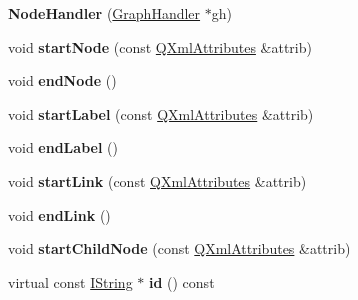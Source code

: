 \begin{DoxyCompactItemize}
\item 
\hypertarget{class_node_handler_ad8877961981fe68380ad0bcc79fce7ac}{{\bfseries Node\-Handler} (\hyperlink{class_graph_handler}{Graph\-Handler} $\ast$gh)}\label{class_node_handler_ad8877961981fe68380ad0bcc79fce7ac}

\item 
\hypertarget{class_node_handler_a83956918f974591de4c7abe4f194060c}{void {\bfseries start\-Node} (const \hyperlink{class_q_xml_attributes}{Q\-Xml\-Attributes} \&attrib)}\label{class_node_handler_a83956918f974591de4c7abe4f194060c}

\item 
\hypertarget{class_node_handler_a91894c1a2d6607200f926582c301791b}{void {\bfseries end\-Node} ()}\label{class_node_handler_a91894c1a2d6607200f926582c301791b}

\item 
\hypertarget{class_node_handler_a2b663a7dc2bd0f3497886f13d78939f2}{void {\bfseries start\-Label} (const \hyperlink{class_q_xml_attributes}{Q\-Xml\-Attributes} \&attrib)}\label{class_node_handler_a2b663a7dc2bd0f3497886f13d78939f2}

\item 
\hypertarget{class_node_handler_ad9ea8a232968cff5cbdb533a1c9fee52}{void {\bfseries end\-Label} ()}\label{class_node_handler_ad9ea8a232968cff5cbdb533a1c9fee52}

\item 
\hypertarget{class_node_handler_a537fb712d08bab9c4ad5812a84f7a4b3}{void {\bfseries start\-Link} (const \hyperlink{class_q_xml_attributes}{Q\-Xml\-Attributes} \&attrib)}\label{class_node_handler_a537fb712d08bab9c4ad5812a84f7a4b3}

\item 
\hypertarget{class_node_handler_a195e23a7cfb9bc3cdc5e2fb4ca18d603}{void {\bfseries end\-Link} ()}\label{class_node_handler_a195e23a7cfb9bc3cdc5e2fb4ca18d603}

\item 
\hypertarget{class_node_handler_a4387c021769bc2f0b08580eff7f6dc28}{void {\bfseries start\-Child\-Node} (const \hyperlink{class_q_xml_attributes}{Q\-Xml\-Attributes} \&attrib)}\label{class_node_handler_a4387c021769bc2f0b08580eff7f6dc28}

\item 
\hypertarget{class_node_handler_acf656d73faffcdf0382f68eb78869cf4}{virtual const \hyperlink{class_i_string}{I\-String} $\ast$ {\bfseries id} () const }\label{class_node_handler_acf656d73faffcdf0382f68eb78869cf4}


\end{DoxyCompactItemize}
